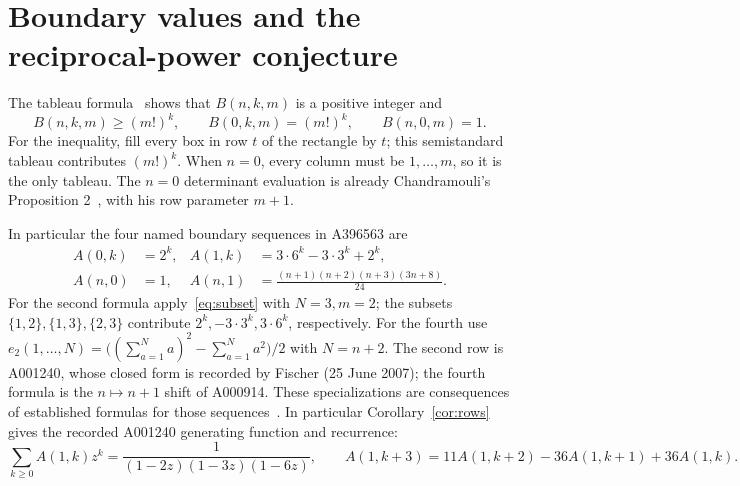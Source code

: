 \documentclass[11pt]{article}
\begin{document}
\section{Boundary values and the reciprocal-power conjecture}
The tableau formula~\cite[\S3.2, (24)]{tamvakis} shows that
$B(n,k,m)$ is a positive integer and
\begin{equation}\label{eq:lower}
B(n,k,m)\geq(m!)^k,\qquad B(0,k,m)=(m!)^k,\qquad B(n,0,m)=1.
\end{equation}
For the inequality, fill every box in row $t$ of the rectangle by $t$;
this semistandard tableau contributes $(m!)^k$.
When $n=0$, every column must be $1,\ldots,m$, so it is the only tableau.
The $n=0$ determinant evaluation is already Chandramouli's
Proposition 2~\cite{chandramouli}, with his row parameter $m+1$.

In particular the four named boundary sequences in A396563 are
\begin{align*}
A(0,k)&=2^k, & A(1,k)&=3\cdot6^k-3\cdot3^k+2^k,\\
A(n,0)&=1, & A(n,1)&=\frac{(n+1)(n+2)(n+3)(3n+8)}{24}.
\end{align*}
For the second formula apply~\eqref{eq:subset} with $N=3,m=2$;
the subsets $\{1,2\},\{1,3\},\{2,3\}$ contribute
$2^k,-3\cdot3^k,3\cdot6^k$, respectively.
For the fourth use
$e_2(1,\ldots,N)=\big((\sum_{a=1}^Na)^2-\sum_{a=1}^Na^2\big)/2$
with $N=n+2$.
The second row is A001240, whose closed form is recorded by Fischer
(25 June 2007); the fourth formula is the $n\mapsto n+1$ shift of A000914.
These specializations are consequences of established formulas for those
sequences~\cite{boundaries}.
In particular Corollary~\ref{cor:rows} gives the recorded A001240 generating
function and recurrence:
\[
\sum_{k\geq0}A(1,k)z^k=\frac1{(1-2z)(1-3z)(1-6z)},\qquad
A(1,k+3)=11A(1,k+2)-36A(1,k+1)+36A(1,k).
\]
\end{document}
